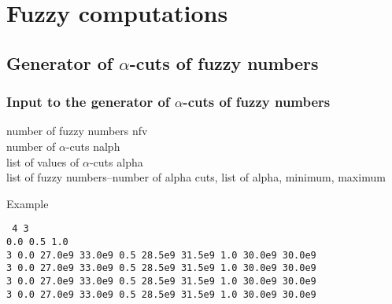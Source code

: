 \chapter{Fuzzy computations}

\section{Generator of $\alpha$-cuts of fuzzy numbers}

\subsection{Input to the generator of $\alpha$-cuts of fuzzy numbers}

number of fuzzy numbers nfv
\\
number of $\alpha$-cuts nalph
\\
list of values of $\alpha$-cuts alpha
\\
list of fuzzy numbers--number of alpha cuts, list of alpha, minimum, maximum

Example

{\tt
4 3
\\
0.0 0.5 1.0
\\
3  0.0 27.0e9 33.0e9   0.5 28.5e9 31.5e9   1.0 30.0e9 30.0e9
\\
3  0.0 27.0e9 33.0e9   0.5 28.5e9 31.5e9   1.0 30.0e9 30.0e9
\\
3  0.0 27.0e9 33.0e9   0.5 28.5e9 31.5e9   1.0 30.0e9 30.0e9
\\
3  0.0 27.0e9 33.0e9   0.5 28.5e9 31.5e9   1.0 30.0e9 30.0e9
}
